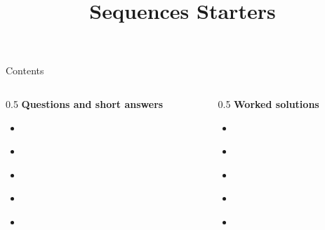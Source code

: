 \documentclass{beamer}
\title{Sequences Starters}
\author{}
\date{}
\begin{document}
\frame{\titlepage}

\begin{frame}{Contents}
\small
\begin{columns}[T]
  \begin{column}{0.5\textwidth}
    \textbf{Questions and short answers}
    \begin{itemize}
      \item \hyperlink{q-st1}{}
      \item \hyperlink{q-st2}{}
      \item \hyperlink{q-st3}{}
      \item \hyperlink{q-st4}{}
      \item \hyperlink{q-st5}{}
    \end{itemize}
  \end{column}
  \begin{column}{0.5\textwidth}
    \textbf{Worked solutions}
    \begin{itemize}
      \item \hyperlink{work-st1}{}
      \item \hyperlink{work-st2}{}
      \item \hyperlink{work-st3}{}
      \item \hyperlink{work-st4}{}
      \item \hyperlink{work-st5}{}
    \end{itemize}
  \end{column}
\end{columns}
\end{frame}
\end{document}
